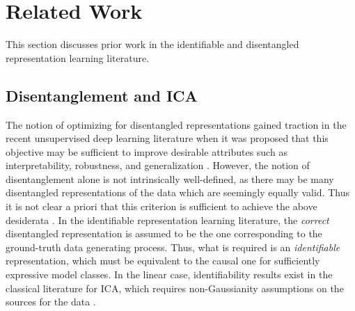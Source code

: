 \documentclass[10pt]{article} %
\theoremstyle{plain}
\theoremstyle{definition}
\begin{document}
\section{Related Work}\label{sec:related-work}
This section discusses prior work in the identifiable and disentangled representation learning literature.
\subsection{Disentanglement and ICA}
The notion of optimizing for disentangled representations gained traction in the recent unsupervised deep learning literature when it was proposed that this objective may be sufficient to improve desirable attributes such as interpretability, robustness, and generalization \citep{bengio2013representation,Higgins_Matthey_Pal_Burgess_Glorot_Botvinick_Mohamed_Lerchner_2017,chen2016infogan}. However, 
the notion of disentanglement alone is not intrinsically well-defined, as there may be many disentangled representations of the data which are seemingly equally valid. Thus it is not clear a priori that this criterion is sufficient to achieve the above desiderata \citep{Locatello_Bauer_Lucic_Raetsch_Gelly_Scholkopf_Bachem_2019}. In the identifiable representation learning literature, the \textit{correct} disentangled representation is assumed to be the one 
corresponding to the ground-truth data generating process. Thus, what is required is an \textit{identifiable} representation, which must be equivalent to the causal one for sufficiently expressive model classes. In the linear case, identifiability results exist 
in the classical literature for ICA, which requires non-Gaussianity assumptions on the sources for the data \citep{Herault_Jutten_1986,Comon_1994}. 
\end{document}
